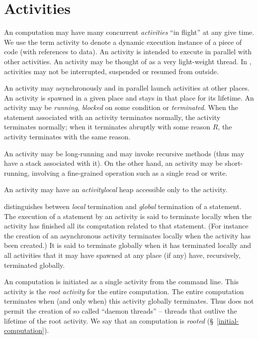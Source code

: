 \chapter{Activities}\label{XtenActivities}

An \Xten{} computation may have many concurrent {\em activities} ``in
flight'' at any give time. We use the term activity to denote a
dynamic execution instance of a piece of code (with references to
data). An activity is intended to execute in parallel with other
activities. An activity may be thought of as a very light-weight
thread.  In \XtenCurrVer{}, activities may not be interrupted,
suspended or resumed from outside. 

An activity may asynchronously and in parallel launch activities at
other places. An activity is spawned in a given place and stays in
that place for its lifetime.  An activity may be {\em running}, {\em
blocked} on some condition or {\em terminated}. When the statement
associated with an activity terminates normally, the activity
terminates normally; when it terminates abruptly with some reason $R$,
the activity terminates with the same reason.

An activity may be long-running and may invoke recursive methods (thus
may have a stack associated with it). On the other hand, an activity
may be short-running, involving a fine-grained
operation such as a single read or write.

An activity may have an {\em activitylocal} heap accessible only
to the activity. 

\Xten{} distinguishes between {\em local} termination and {\em global}
termination of a statement. The execution of a statement by an
activity is said to terminate locally when the activity has finished
all its computation related to that statement. (For instance the
creation of an asynchronous activity terminates locally when the
activity has been created.)  It is said to terminate globally when it
has terminated locally and all activities that it may have spawned at
any place (if any) have, recursively, terminated globally.

An \Xten{} computation is initiated as a single activity from the
command line. This activity is the {\em root activity} for the entire computation. The entire computation
terminates when (and only when) this activity globally
terminates. Thus \Xten{} does not permit the creation of so called
``daemon threads'' -- threads that outlive the lifetime of the root
activity. We say that an \Xten{} computation is {\em rooted}
(\S~\ref{initial-computation}).

